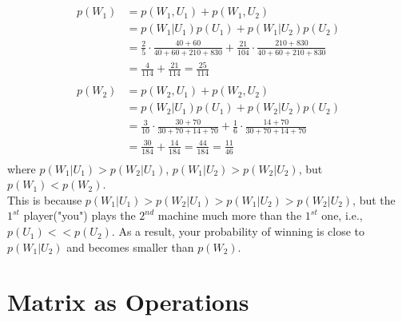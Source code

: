 \documentclass{article}
\begin{document}
    \subsection{}\label{1.3}
        \begin{align*}
            p(W_1)&=p(W_1, U_1)+p(W_1, U_2)\\
            &=p(W_1|U_1)p(U_1)+p(W_1|U_2)p(U_2)\\
            &=\frac{2}{5}\cdot\frac{40+60}{40+60+210+830}+\frac{21}{104}\cdot\frac{210+830}{40+60+210+830}\\
            &=\frac{4}{114}+\frac{21}{114}=\frac{25}{114}\\
        \end{align*}
        \begin{align*}
            p(W_2)&=p(W_2, U_1)+p(W_2, U_2)\\
            &=p(W_2|U_1)p(U_1)+p(W_2|U_2)p(U_2)\\
            &=\frac{3}{10}\cdot\frac{30+70}{30+70+14+70}+\frac{1}{6}\cdot\frac{14+70}{30+70+14+70}\\
            &=\frac{30}{184}+\frac{14}{184}=\frac{44}{184}=\frac{11}{46}\\
        \end{align*}
        where  $p(W_1|U_1)>p(W_2|U_1)$, $p(W_1|U_2)>p(W_2|U_2)$, but  $p(W_{1})<p(W_{2})$.\\
        This is because $p(W_1|U_1)>p(W_2|U_1)>p(W_1|U_2)>p(W_2|U_2)$, 
        but the $1^{st}$ player("you") plays the $2^{nd}$ machine much more than the $1^{st}$ one, i.e., $p(U_1)<<p(U_2)$.
        As a result, your probability of winning is close to $p(W_1|U_2)$ and becomes smaller than $p(W_2).$

    \section{Matrix as Operations}
\end{document}
